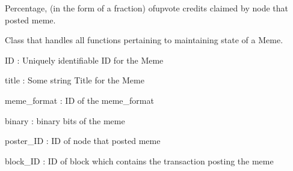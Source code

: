\documentclass[letterpaper,10pt,english]{sphinxmanual}
\begin{document}

\begin{fulllineitems}
\label{\detokenize{index:node_state.MEME_POSTER_PORTION}}
Percentage, (in the form of a fraction) ofupvote credits claimed
by node that posted meme.

\end{fulllineitems}


\begin{fulllineitems}
\label{\detokenize{index:node_state.Meme}}
Class that handles all functions pertaining to maintaining state
of a Meme.

\begin{fulllineitems}
\label{\detokenize{index:node_state.Meme.__init__}}
ID : Uniquely identifiable ID for the Meme

title : Some string Title for the Meme

meme\_format : ID of the meme\_format

binary : binary bits of the meme

poster\_ID : ID of node that posted meme

block\_ID : ID of block which contains the transaction posting the meme


\end{fulllineitems}
\end{fulllineitems}
\end{document}
